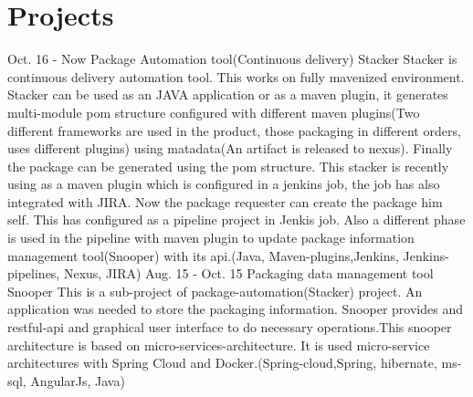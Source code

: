 \documentclass[]{cv-class}
\begin{document}
\section{Projects}
\begin{entrylist}
  \entry
    {Oct. 16 - Now}
    {Package Automation tool(Continuous delivery)}
    {Stacker}
    {Stacker is continuous delivery automation tool. This works on fully mavenized environment. Stacker can be used as an JAVA 		application or as a maven plugin, it generates multi-module pom structure configured with different maven plugins(Two 			different frameworks are used in the product, those packaging in different orders, uses different plugins) using matadata(An artifact is released to nexus). Finally the package can be generated using the pom structure. This stacker is recently using as a maven plugin which is configured in a jenkins job, the job has also integrated with JIRA. Now the package requester 		can create the package him self. This has configured as a pipeline project in Jenkis job. Also a different phase is used in the pipeline with maven plugin to update package information management tool(Snooper) with its api.(Java, Maven-plugins,Jenkins, Jenkins-pipelines, Nexus, JIRA)}
    \entry
    {Aug. 15 - Oct. 15}
    {Packaging data management tool}
    {Snooper}
{This is a sub-project of package-automation(Stacker) project. An application was needed to store the packaging information. Snooper provides and restful-api and graphical user interface to do necessary operations.This snooper architecture is based on micro-services-architecture. It is used micro-service architectures with Spring Cloud and Docker.(Spring-cloud,Spring, hibernate, ms-sql, AngularJs, Java)}
\end{entrylist}

\newpage

\begin{aside}
\end{aside}
\end{document}
